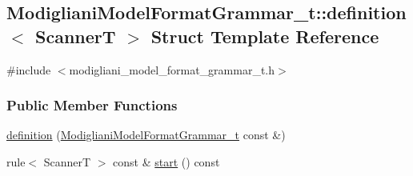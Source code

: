 \subsection{ModiglianiModelFormatGrammar\_\-t::definition$<$ ScannerT $>$ Struct Template Reference}
\label{struct_modigliani_model_format_grammar__t_1_1definition}


{\ttfamily \#include $<$modigliani\_\-model\_\-format\_\-grammar\_\-t.h$>$}

\subsubsection*{Public Member Functions}
\begin{DoxyCompactItemize}
\item 
\hyperlink{struct_modigliani_model_format_grammar__t_1_1definition_ae0523a51d323be8a5345877269937620}{definition} (\hyperlink{struct_modigliani_model_format_grammar__t}{ModiglianiModelFormatGrammar\_\-t} const \&)
\item 
rule$<$ ScannerT $>$ const \& \hyperlink{struct_modigliani_model_format_grammar__t_1_1definition_a5767dbb34c8b3e5fd8013fbcbdb77643}{start} () const 
\end{DoxyCompactItemize}
